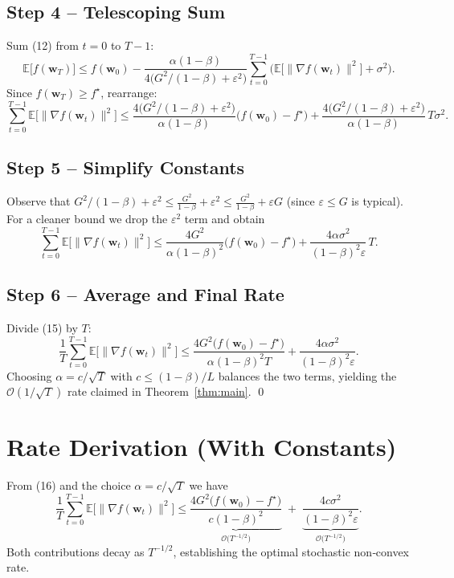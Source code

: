 \documentclass{article}
\newcommand{\E}{\mathbb{E}}
\begin{document}
\subsection*{Step 4 – Telescoping Sum}
Sum (12) from $t=0$ to $T-1$:
\[
\E\!\big[f(\bm w_{T})\big]
\le f(\bm w_{0})
-\frac{\alpha(1-\beta)}{4\big(G^{2}/(1-\beta)+\varepsilon^{2}\big)}
\sum_{t=0}^{T-1}\Big(\E\!\big[\|\nabla f(\bm w_{t})\|^{2}\big]+\sigma^{2}\Big).
\tag{13}
\]
Since $f(\bm w_{T})\ge f^{\star}$, rearrange:
\[
\sum_{t=0}^{T-1}\E\!\big[\|\nabla f(\bm w_{t})\|^{2}\big]
\le
\frac{4\big(G^{2}/(1-\beta)+\varepsilon^{2}\big)}{\alpha(1-\beta)}
\big(f(\bm w_{0})-f^{\star}\big)
+\frac{4\big(G^{2}/(1-\beta)+\varepsilon^{2}\big)}{\alpha(1-\beta)}\,T\sigma^{2}.
\tag{14}
\]

\subsection*{Step 5 – Simplify Constants}
Observe that $G^{2}/(1-\beta)+\varepsilon^{2}\le
\frac{G^{2}}{1-\beta}+\varepsilon^{2}\le
\frac{G^{2}}{1-\beta}+\varepsilon G$ (since $\varepsilon\le G$ is typical).
For a cleaner bound we drop the $\varepsilon^{2}$ term and obtain
\[
\sum_{t=0}^{T-1}\E\!\big[\|\nabla f(\bm w_{t})\|^{2}\big]
\le
\frac{4G^{2}}{\alpha(1-\beta)^{2}}
\big(f(\bm w_{0})-f^{\star}\big)
+\frac{4\alpha\sigma^{2}}{(1-\beta)^{2}\varepsilon}\,T.
\tag{15}
\]

\subsection*{Step 6 – Average and Final Rate}
Divide (15) by $T$:
\[
\frac{1}{T}\sum_{t=0}^{T-1}\E\!\big[\|\nabla f(\bm w_{t})\|^{2}\big]
\le
\frac{4G^{2}\big(f(\bm w_{0})-f^{\star}\big)}{\alpha(1-\beta)^{2}T}
+\frac{4\alpha\sigma^{2}}{(1-\beta)^{2}\varepsilon}.
\tag{16}
\]
Choosing $\alpha=c/\sqrt{T}$ with $c\le (1-\beta)/L$ balances the two terms,
yielding the $\mathcal O(1/\sqrt{T})$ rate claimed in Theorem~\ref{thm:main}.
\qed

\section*{Rate Derivation (With Constants)}
From (16) and the choice $\alpha=c/\sqrt{T}$ we have
\[
\frac{1}{T}\sum_{t=0}^{T-1}\E\!\big[\|\nabla f(\bm w_{t})\|^{2}\big]
\le
\underbrace{\frac{4G^{2}\big(f(\bm w_{0})-f^{\star}\big)}{c(1-\beta)^{2}}}_{\displaystyle\mathcal O\!\big(T^{-1/2}\big)}
\;+\;
\underbrace{\frac{4c\sigma^{2}}{(1-\beta)^{2}\varepsilon}}_{\displaystyle\mathcal O\!\big(T^{-1/2}\big)}.
\tag{17}
\]
Both contributions decay as $T^{-1/2}$, establishing the optimal stochastic
non‑convex rate.
\end{document}
